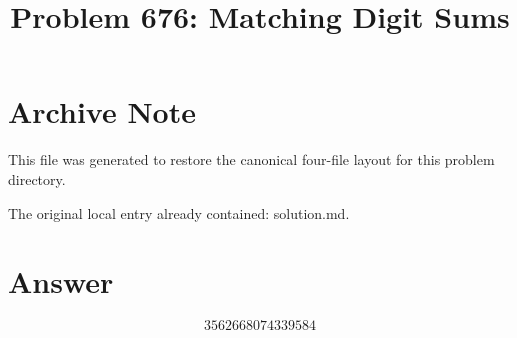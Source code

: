 \documentclass[11pt]{article}
\title{Problem 676: Matching Digit Sums}
\author{}
\date{}
\begin{document}
\maketitle

\section{Archive Note}
This file was generated to restore the canonical four-file layout for this problem directory.

The original local entry already contained: solution.md.

\section{Answer}

\[
\boxed{3562668074339584}
\]
\end{document}
